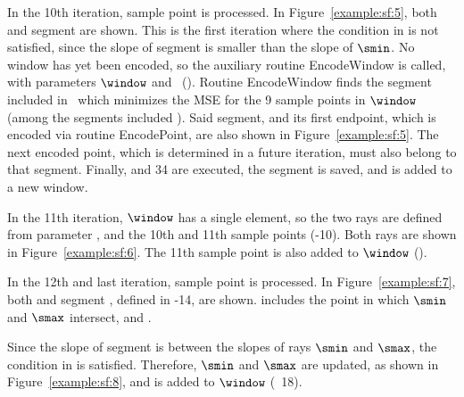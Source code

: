 

In the 10th iteration, sample point  is processed. In Figure~\ref{example:sf:5}, both  and segment  are shown. This is the first iteration where the condition in  is not satisfied, since the slope of segment  is smaller than the slope of $\smin$. No window has yet been encoded, so the auxiliary routine EncodeWindow is called, with parameters $\window$ and \segmentSet\ (). Routine EncodeWindow finds the segment included in \segmentSet\ which minimizes the MSE for the 9 sample points in $\window$ (among the segments included \segmentSet). Said segment, and its first endpoint, which is encoded via routine EncodePoint, are also shown in Figure~\ref{example:sf:5}. The next encoded point, which is determined in a future iteration, must also belong to that segment. Finally,  and 34 are executed, the segment is saved, and  is added to a new window.




\clearpage


In the 11th iteration, $\window$ has a single element, so the two rays are defined from parameter \maxerror, and the 10th and 11th sample points (-10). Both rays are shown in Figure~\ref{example:sf:6}. The 11th sample point is also added to $\window$ ().




In the 12th and last iteration, sample point  is processed. In Figure~\ref{example:sf:7}, both  and segment , defined in -14, are shown.  includes the point in which $\smin$ and $\smax$ intersect, and .



\clearpage


Since the slope of segment  is between the slopes of rays $\smin$ and $\smax$, the condition in  is satisfied. Therefore, $\smin$ and $\smax$ are updated, as shown in Figure~\ref{example:sf:8}, and  is added to $\window$ (\Line~18).


\vspace{-5pt}


